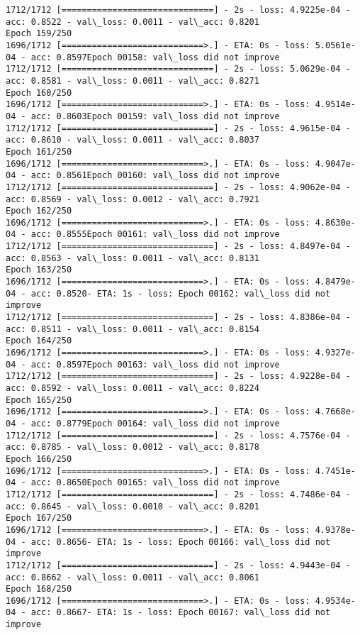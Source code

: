 \documentclass[11pt]{article}
\begin{document}
\begin{Verbatim}[commandchars=\\\{\}]
1712/1712 [==============================] - 2s - loss: 4.9225e-04 - acc: 0.8522 - val\_loss: 0.0011 - val\_acc: 0.8201
Epoch 159/250
1696/1712 [============================>.] - ETA: 0s - loss: 5.0561e-04 - acc: 0.8597Epoch 00158: val\_loss did not improve
1712/1712 [==============================] - 2s - loss: 5.0629e-04 - acc: 0.8581 - val\_loss: 0.0011 - val\_acc: 0.8271
Epoch 160/250
1696/1712 [============================>.] - ETA: 0s - loss: 4.9514e-04 - acc: 0.8603Epoch 00159: val\_loss did not improve
1712/1712 [==============================] - 2s - loss: 4.9615e-04 - acc: 0.8610 - val\_loss: 0.0011 - val\_acc: 0.8037
Epoch 161/250
1696/1712 [============================>.] - ETA: 0s - loss: 4.9047e-04 - acc: 0.8561Epoch 00160: val\_loss did not improve
1712/1712 [==============================] - 2s - loss: 4.9062e-04 - acc: 0.8569 - val\_loss: 0.0012 - val\_acc: 0.7921
Epoch 162/250
1696/1712 [============================>.] - ETA: 0s - loss: 4.8630e-04 - acc: 0.8555Epoch 00161: val\_loss did not improve
1712/1712 [==============================] - 2s - loss: 4.8497e-04 - acc: 0.8563 - val\_loss: 0.0011 - val\_acc: 0.8131
Epoch 163/250
1696/1712 [============================>.] - ETA: 0s - loss: 4.8479e-04 - acc: 0.8520- ETA: 1s - loss: Epoch 00162: val\_loss did not improve
1712/1712 [==============================] - 2s - loss: 4.8386e-04 - acc: 0.8511 - val\_loss: 0.0011 - val\_acc: 0.8154
Epoch 164/250
1696/1712 [============================>.] - ETA: 0s - loss: 4.9327e-04 - acc: 0.8597Epoch 00163: val\_loss did not improve
1712/1712 [==============================] - 2s - loss: 4.9228e-04 - acc: 0.8592 - val\_loss: 0.0011 - val\_acc: 0.8224
Epoch 165/250
1696/1712 [============================>.] - ETA: 0s - loss: 4.7668e-04 - acc: 0.8779Epoch 00164: val\_loss did not improve
1712/1712 [==============================] - 2s - loss: 4.7576e-04 - acc: 0.8785 - val\_loss: 0.0012 - val\_acc: 0.8178
Epoch 166/250
1696/1712 [============================>.] - ETA: 0s - loss: 4.7451e-04 - acc: 0.8650Epoch 00165: val\_loss did not improve
1712/1712 [==============================] - 2s - loss: 4.7486e-04 - acc: 0.8645 - val\_loss: 0.0010 - val\_acc: 0.8201
Epoch 167/250
1696/1712 [============================>.] - ETA: 0s - loss: 4.9378e-04 - acc: 0.8656- ETA: 1s - loss: Epoch 00166: val\_loss did not improve
1712/1712 [==============================] - 2s - loss: 4.9443e-04 - acc: 0.8662 - val\_loss: 0.0011 - val\_acc: 0.8061
Epoch 168/250
1696/1712 [============================>.] - ETA: 0s - loss: 4.9534e-04 - acc: 0.8667- ETA: 1s - loss: Epoch 00167: val\_loss did not improve

\end{Verbatim}
\end{document}
